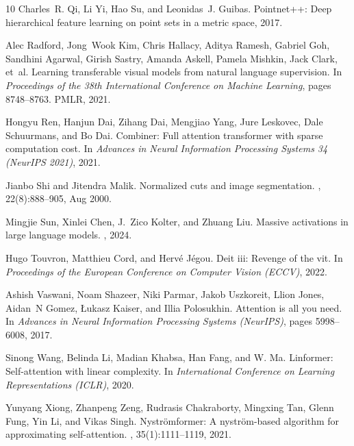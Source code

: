\documentclass[10pt,twocolumn,letterpaper]{article}
\begin{document}
{\begin{thebibliography}{10}
Charles~R. Qi, Li Yi, Hao Su, and Leonidas~J. Guibas.
\newblock Pointnet++: Deep hierarchical feature learning on point sets in a metric space, 2017.

Alec Radford, Jong~Wook Kim, Chris Hallacy, Aditya Ramesh, Gabriel Goh, Sandhini Agarwal, Girish Sastry, Amanda Askell, Pamela Mishkin, Jack Clark, et~al.
\newblock Learning transferable visual models from natural language supervision.
\newblock In {\em Proceedings of the 38th International Conference on Machine Learning}, pages 8748--8763. PMLR, 2021.

Hongyu Ren, Hanjun Dai, Zihang Dai, Mengjiao Yang, Jure Leskovec, Dale Schuurmans, and Bo Dai.
\newblock Combiner: Full attention transformer with sparse computation cost.
\newblock In {\em Advances in Neural Information Processing Systems 34 (NeurIPS 2021)}, 2021.

Jianbo Shi and Jitendra Malik.
\newblock Normalized cuts and image segmentation.
, 22(8):888--905, Aug 2000.

Mingjie Sun, Xinlei Chen, J.~Zico Kolter, and Zhuang Liu.
\newblock Massive activations in large language models.
, 2024.

Hugo Touvron, Matthieu Cord, and Hervé Jégou.
\newblock Deit iii: Revenge of the vit.
\newblock In {\em Proceedings of the European Conference on Computer Vision (ECCV)}, 2022.

Ashish Vaswani, Noam Shazeer, Niki Parmar, Jakob Uszkoreit, Llion Jones, Aidan~N Gomez, {\L}ukasz Kaiser, and Illia Polosukhin.
\newblock Attention is all you need.
\newblock In {\em Advances in Neural Information Processing Systems (NeurIPS)}, pages 5998--6008, 2017.

Sinong Wang, Belinda Li, Madian Khabsa, Han Fang, and W. Ma.
\newblock Linformer: Self-attention with linear complexity.
\newblock In {\em International Conference on Learning Representations (ICLR)}, 2020.

Yunyang Xiong, Zhanpeng Zeng, Rudrasis Chakraborty, Mingxing Tan, Glenn Fung, Yin Li, and Vikas Singh.
\newblock Nyströmformer: A nyström-based algorithm for approximating self-attention.
, 35(1):1111--1119, 2021.


\end{thebibliography}}
\end{document}
